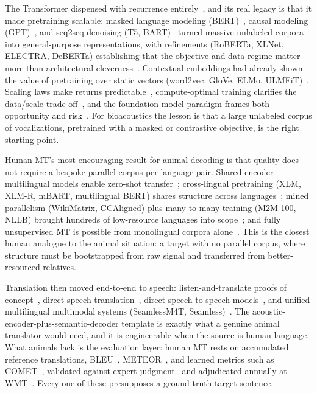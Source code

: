 The Transformer dispensed with recurrence entirely~\cite{vaswani2017attention},
and its real legacy is that it made pretraining scalable: masked language
modeling (BERT)~\cite{devlin2019bert}, causal modeling
(GPT)~\cite{radford2018gpt,radford2019gpt2,brown2020gpt3}, and seq2seq
denoising (T5, BART)~\cite{raffel2020t5,lewis2020bart} turned massive
unlabeled corpora into general-purpose representations, with refinements
(RoBERTa, XLNet, ELECTRA, DeBERTa) establishing that the objective and data
regime matter more than architectural
cleverness~\cite{liu2019roberta,yang2019xlnet,clark2020electra,he2021deberta}.
Contextual embeddings had already shown the value of pretraining over
static vectors (word2vec, GloVe, ELMo,
ULMFiT)~\cite{mikolov2013word2vec,pennington2014glove,peters2018elmo,howard2018ulmfit}.
Scaling laws make returns predictable~\cite{kaplan2020scaling},
compute-optimal training clarifies the data/scale
trade-off~\cite{hoffmann2022chinchilla}, and the foundation-model paradigm
frames both opportunity and risk~\cite{bommasani2021foundation}. For
bioacoustics the lesson is that a large unlabeled corpus of vocalizations,
pretrained with a masked or contrastive objective, is the right starting
point.

Human MT's most encouraging result for animal decoding is that quality does
not require a bespoke parallel corpus per language pair. Shared-encoder
multilingual models enable zero-shot
transfer~\cite{johnson2017multilingual,firat2016multiway}; cross-lingual
pretraining (XLM, XLM-R, mBART, multilingual BERT) shares structure across
languages~\cite{conneau2019xlm,conneau2020xlmr,liu2020mbart,pires2019mbert};
mined parallelism (WikiMatrix, CCAligned) plus many-to-many training (M2M-100,
NLLB) brought hundreds of low-resource languages into
scope~\cite{schwenk2021wikimatrix,elkishky2020ccaligned,fan2021beyond,costajussa2022nllb,nllb2024scaling};
and fully unsupervised MT is possible from monolingual corpora
alone~\cite{artetxe2018unsupervised,lample2018unsupervised}. This is the
closest human analogue to the animal situation: a target with no parallel
corpus, where structure must be bootstrapped from raw signal and transferred
from better-resourced relatives.

Translation then moved end-to-end to speech: listen-and-translate proofs of
concept~\cite{berard2016listen}, direct speech
translation~\cite{weiss2017speech}, direct speech-to-speech
models~\cite{jia2019direct}, and unified multilingual multimodal systems
(SeamlessM4T, Seamless)~\cite{seamless2023m4t,seamless2024streaming}. The
acoustic-encoder-plus-semantic-decoder template is exactly what a genuine
animal translator would need, and it is engineerable when the source is
human language. What animals lack is the evaluation layer: human MT rests on
accumulated reference translations, BLEU~\cite{papineni2002bleu},
METEOR~\cite{denkowski2014meteor}, and learned metrics such as
COMET~\cite{rei2020comet}, validated against expert
judgment~\cite{freitag2021experts} and adjudicated annually at
WMT~\cite{bojar2018wmt,barrault2019wmt,kocmi2022wmt}. Every one of these
presupposes a ground-truth target sentence.

